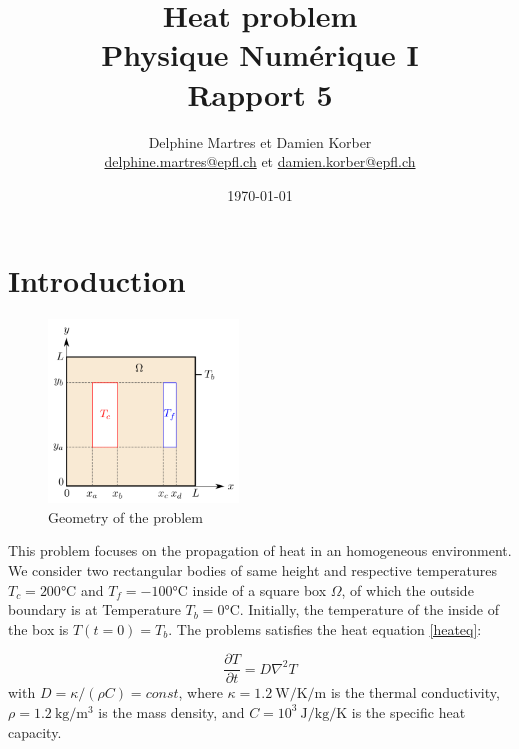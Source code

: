 \documentclass[a4paper,12pt,twoside]{article}
\newcommand{\mail}[1]{{\href{mailto:#1}{#1}}}
\begin{document}
\title{Heat problem\\{\small Physique Numérique I}\\{\small Rapport 5}}
\date{\today}
\author{Delphine Martres et Damien Korber\\{\small \mail{delphine.martres@epfl.ch} et \mail{damien.korber@epfl.ch}}}

\maketitle
\tableofcontents %


\baselineskip=16pt
\parindent=15pt
\parskip=5pt
\newpage



\section{Introduction}

\begin{figure}
 \includegraphics[width=0.45\textwidth]{graphs/schema.png}
 \caption{Geometry of the problem}
 \label{schema}
\end{figure}


This problem focuses on the propagation of heat in an homogeneous environment.
We consider two rectangular bodies of same height and respective temperatures $T_c = 200$°C and $T_f = -100$°C inside of a square box $\Omega$, of which the outside boundary is at Temperature $T_b = 0$°C. Initially, the temperature of the inside of the box is $T(t=0) = T_b$. The problems satisfies the heat equation \eqref{heateq}:

\begin{equation}
 \frac{\partial T}{\partial t} = D\nabla ^2 T
 \label{heateq}
\end{equation}
with $D=\kappa/(\rho C)=const$, where $\kappa=1.2~\si{\W \per \K \per \m}$ is the thermal conductivity, $\rho=1.2~\si{\kg \per \m^3}$ is the mass density, and $C=10^3~\si{\J \per \kg \per \K}$ is the specific heat capacity.
\end{document}
